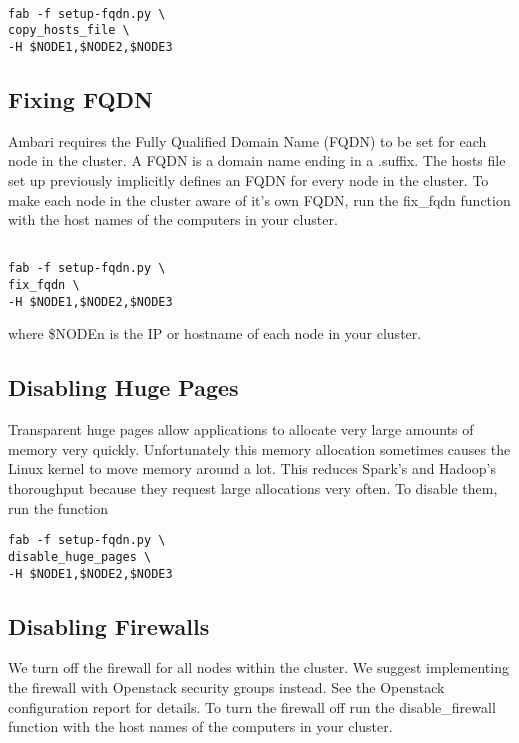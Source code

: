 \documentclass[9pt,twocolumn,twoside]{idsi}
\begin{document}
\begin{verbatim}

fab -f setup-fqdn.py \
copy_hosts_file \
-H $NODE1,$NODE2,$NODE3

\end{verbatim}


\subsection{Fixing FQDN}
Ambari requires the Fully Qualified Domain Name (FQDN) to be set for each node in the cluster. A FQDN is a domain name ending in a .suffix. The hosts file set up previously implicitly defines an FQDN for every node in the cluster. To make each node in the cluster aware of it's own FQDN, run the fix\_fqdn function with the host names of the computers in your cluster.

\begin{verbatim}

fab -f setup-fqdn.py \
fix_fqdn \
-H $NODE1,$NODE2,$NODE3

\end{verbatim}

where \$NODEn is the IP or hostname of each node in your cluster.

\subsection{Disabling Huge Pages}
Transparent huge pages allow applications to allocate very large amounts of memory very quickly. Unfortunately this memory allocation sometimes causes the Linux kernel to move memory around a lot. This reduces Spark's and Hadoop's thoroughput because they request large allocations very often. To disable them, run the  function

\begin{verbatim}
fab -f setup-fqdn.py \
disable_huge_pages \
-H $NODE1,$NODE2,$NODE3
\end{verbatim}

\subsection{Disabling Firewalls}

We turn off the firewall for all nodes within the cluster. We suggest implementing the firewall with Openstack security groups instead. See the Openstack configuration report for details. To turn the firewall off run the disable\_firewall function with the host names of the computers in your cluster.
\end{document}
